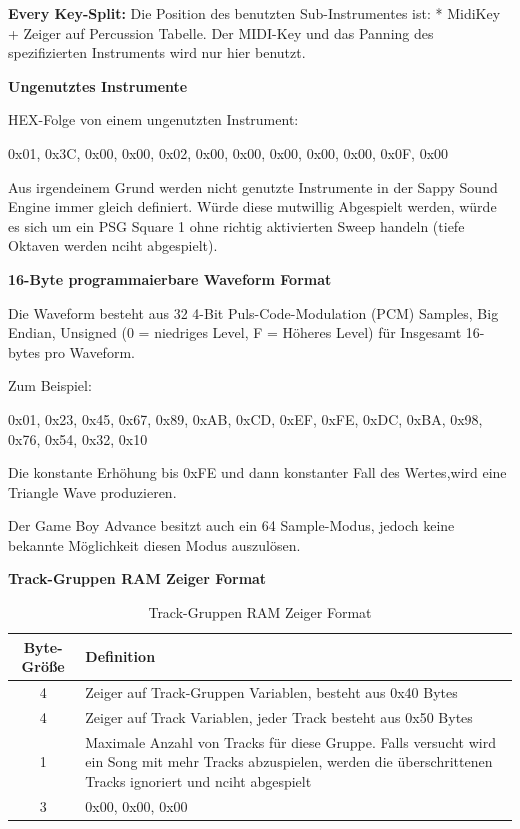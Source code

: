 \documentclass[11pt,a4paper]{scrartcl}
\begin{document}
\textbf{Every Key-Split:}\newline
Die Position des benutzten Sub-Instrumentes ist: * MidiKey + Zeiger auf Percussion Tabelle.\newline
Der MIDI-Key und das Panning des spezifizierten Instruments wird nur hier benutzt.

\vspace{15pt}
\textbf{{\large Ungenutztes Instrumente}}

HEX-Folge von einem ungenutzten Instrument:

0x01, 0x3C, 0x00, 0x00, 0x02, 0x00, 0x00, 0x00, 0x00, 0x00, 0x0F, 0x00

Aus irgendeinem Grund werden nicht genutzte Instrumente in der Sappy Sound Engine immer gleich definiert. W\"{u}rde diese mutwillig Abgespielt werden, w\"{u}rde es sich um ein PSG Square 1 ohne richtig aktivierten Sweep handeln (tiefe Oktaven werden nciht abgespielt).
		
\vspace{15pt}
\textbf{{\large 16-Byte programmaierbare Waveform Format}}

Die Waveform besteht aus 32 4-Bit Puls-Code-Modulation (PCM) Samples, Big Endian, Unsigned (0 = niedriges Level, F = H\"{o}heres Level) f\"{u}r Insgesamt 16-bytes pro Waveform.

Zum Beispiel:

0x01, 0x23, 0x45, 0x67, 0x89, 0xAB, 0xCD, 0xEF, 0xFE, 0xDC, 0xBA, 0x98, 0x76, 0x54, 0x32, 0x10

Die konstante Erh\"{o}hung bis 0xFE und dann konstanter Fall des Wertes,wird eine Triangle Wave produzieren.

Der Game Boy Advance besitzt auch ein 64 Sample-Modus, jedoch keine bekannte M\"{o}glichkeit diesen Modus auszul\"{o}sen.

\newpage
\textbf{{\large Track-Gruppen RAM Zeiger Format}}

\begin{table}[h]
    \centering
    \begin{tabular}{ c | p{15cm} }
        \textbf{Byte-Gr\"{o}{\ss}e} & \textbf{Definition}\\
        \hline
        4 & Zeiger auf Track-Gruppen Variablen, besteht aus 0x40 Bytes\\
				\hline
        4 & Zeiger auf Track Variablen, jeder Track besteht aus 0x50 Bytes\\
				\hline
        1 & Maximale Anzahl von Tracks f\"{u}r diese Gruppe. Falls versucht wird ein Song mit mehr Tracks abzuspielen, werden die \"{u}berschrittenen Tracks ignoriert und nciht abgespielt\\
				\hline
        3 & 0x00, 0x00, 0x00\\
    \end{tabular}
    \caption{Track-Gruppen RAM Zeiger Format}
    \label{table:RAMZeiger}
\end{table}
\end{document}
